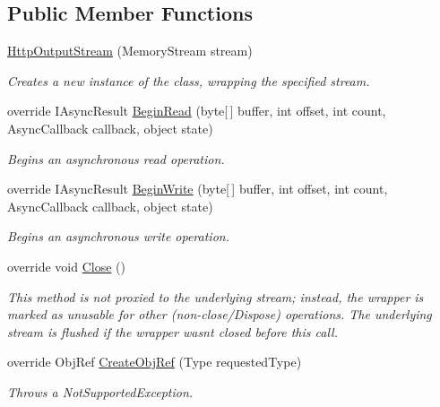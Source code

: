 \subsection*{Public Member Functions}
\begin{DoxyCompactItemize}
\item 
\hyperlink{class_p_http_1_1_http_output_stream_af724a23a088e6cb05f4fe5fbe324c839}{Http\+Output\+Stream} (Memory\+Stream stream)
\begin{DoxyCompactList}\small\item\em Creates a new instance of the class, wrapping the specified stream. \end{DoxyCompactList}\item 
override I\+Async\+Result \hyperlink{class_p_http_1_1_http_output_stream_ae852390e54a77bff27b05b15e0edff8f}{Begin\+Read} (byte\mbox{[}$\,$\mbox{]} buffer, int offset, int count, Async\+Callback callback, object state)
\begin{DoxyCompactList}\small\item\em Begins an asynchronous read operation. \end{DoxyCompactList}\item 
override I\+Async\+Result \hyperlink{class_p_http_1_1_http_output_stream_adab5a2e6adb8b211668d994338d938b9}{Begin\+Write} (byte\mbox{[}$\,$\mbox{]} buffer, int offset, int count, Async\+Callback callback, object state)
\begin{DoxyCompactList}\small\item\em Begins an asynchronous write operation. \end{DoxyCompactList}\item 
override void \hyperlink{class_p_http_1_1_http_output_stream_a29789471faa70dd1f01e97894a506b87}{Close} ()
\begin{DoxyCompactList}\small\item\em This method is not proxied to the underlying stream; instead, the wrapper is marked as unusable for other (non-\/close/\+Dispose) operations. The underlying stream is flushed if the wrapper wasn\textquotesingle{}t closed before this call. \end{DoxyCompactList}\item 
override Obj\+Ref \hyperlink{class_p_http_1_1_http_output_stream_affae8b4276a22a7a3cdd0ac6364c9abb}{Create\+Obj\+Ref} (Type requested\+Type)
\begin{DoxyCompactList}\small\item\em Throws a Not\+Supported\+Exception. \end{DoxyCompactList}\item 

\end{DoxyCompactItemize}
